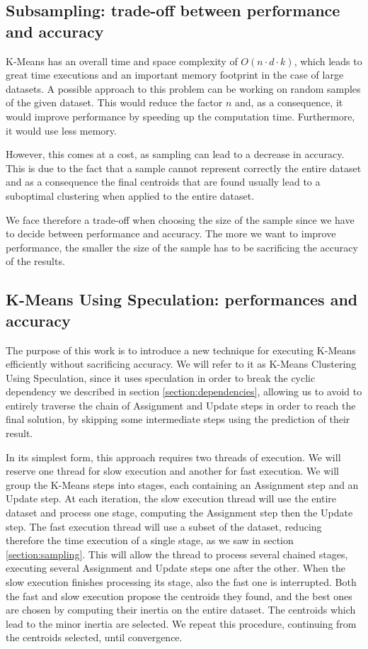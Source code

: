 \label{section:dependencies}

\subsection{Subsampling: trade-off between performance and accuracy}

K-Means has an overall time and space complexity of $O(n\cdot d\cdot k)$, which leads to great time executions and an important memory footprint in the case of large datasets. 
A possible approach to this problem can be working on random samples of the given dataset. This would reduce the factor $n$ and, as a consequence, it would improve performance by speeding up the computation time. Furthermore, it would use less memory. 

However, this comes at a cost, as sampling can lead to a decrease in accuracy. This is due to the fact that a sample cannot represent correctly the entire dataset and as a consequence the final centroids that are found usually lead to a suboptimal clustering when applied to the entire dataset.

We face therefore a trade-off when choosing the size of the sample since we have to decide between performance and accuracy. The more we want to improve performance, the smaller the size of the sample has to be sacrificing the accuracy of the results.
\label{section:sampling}

\subsection{K-Means Using Speculation: performances and accuracy}

The purpose of this work is to introduce a new technique for executing K-Means efficiently without sacrificing accuracy. We will refer to it as K-Means Clustering Using Speculation, since it uses speculation in order to break the cyclic dependency we described in section \ref{section:dependencies}, allowing us to avoid to entirely traverse the chain of Assignment and Update steps in order to reach the final solution, by skipping some intermediate steps using the prediction of their result.  

In its simplest form, this approach requires two threads of execution. We will reserve one thread for slow execution and another for fast execution. We will group the K-Means steps into stages, each containing an Assignment step and an Update step. At each iteration, the slow execution thread will use the entire dataset and process one stage, computing the Assignment step then the Update step. The fast execution thread will use a subset of the dataset, reducing therefore the time execution of a single stage, as we saw in section \ref{section:sampling}. This will allow the thread to process several chained stages, executing several Assignment and Update steps one after the other.
When the slow execution finishes processing its stage, also the fast one is interrupted.
Both the fast and slow execution propose the centroids they found, and the best ones are chosen by computing their inertia on the entire dataset. The centroids which lead to the minor inertia are selected.
We repeat this procedure, continuing from the centroids selected, until convergence.

